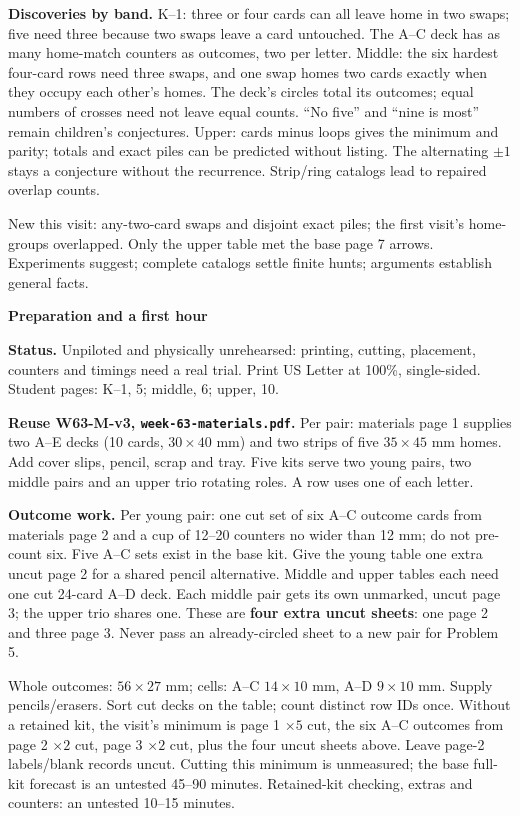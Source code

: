 \documentclass[11pt]{article}
\newcommand{\head}[1]{\par\textbf{\large #1}\par}
\newcommand{\row}[1]{\texttt{#1}}
\begin{document}
\textbf{Discoveries by band.} K--1: three or four cards can all leave home in two swaps; five need three because two swaps leave a card untouched. The A--C deck has as many home-match counters as outcomes, two per letter. Middle: the six hardest four-card rows need three swaps, and one swap homes two cards exactly when they occupy each other's homes. The deck's circles total its outcomes; equal numbers of crosses need not leave equal counts. ``No five'' and ``nine is most'' remain children's conjectures. Upper: cards minus loops gives the minimum and parity; totals and exact piles can be predicted without listing. The alternating $\pm1$ stays a conjecture without the recurrence. Strip/ring catalogs lead to repaired overlap counts.

New this visit: any-two-card swaps and disjoint exact piles; the first visit's home-groups overlapped. Only the upper table met the base page 7 arrows. Experiments suggest; complete catalogs settle finite hunts; arguments establish general facts.
\newpage
\head{Preparation and a first hour}
\textbf{Status.} Unpiloted and physically unrehearsed: printing, cutting, placement, counters and timings need a real trial. Print US Letter at 100\%, single-sided. Student pages: K--1, 5; middle, 6; upper, 10.

\textbf{Reuse W63-M-v3, \row{week-63-materials.pdf}.} Per pair: materials page 1 supplies two A--E decks (10 cards, $30\times40$ mm) and two strips of five $35\times45$ mm homes. Add cover slips, pencil, scrap and tray. Five kits serve two young pairs, two middle pairs and an upper trio rotating roles. A row uses one of each letter.

\textbf{Outcome work.} Per young pair: one cut set of six A--C outcome cards from materials page 2 and a cup of 12--20 counters no wider than 12 mm; do not pre-count six. Five A--C sets exist in the base kit. Give the young table one extra uncut page 2 for a shared pencil alternative. Middle and upper tables each need one cut 24-card A--D deck. Each middle pair gets its own unmarked, uncut page 3; the upper trio shares one. These are \textbf{four extra uncut sheets}: one page 2 and three page 3. Never pass an already-circled sheet to a new pair for Problem 5.

Whole outcomes: $56\times27$ mm; cells: A--C $14\times10$ mm, A--D $9\times10$ mm. Supply pencils/erasers. Sort cut decks on the table; count distinct row IDs once. Without a retained kit, the visit's minimum is page 1 $\times5$ cut, the six A--C outcomes from page 2 $\times2$ cut, page 3 $\times2$ cut, plus the four uncut sheets above. Leave page-2 labels/blank records uncut. Cutting this minimum is unmeasured; the base full-kit forecast is an untested 45--90 minutes. Retained-kit checking, extras and counters: an untested 10--15 minutes.
\end{document}
